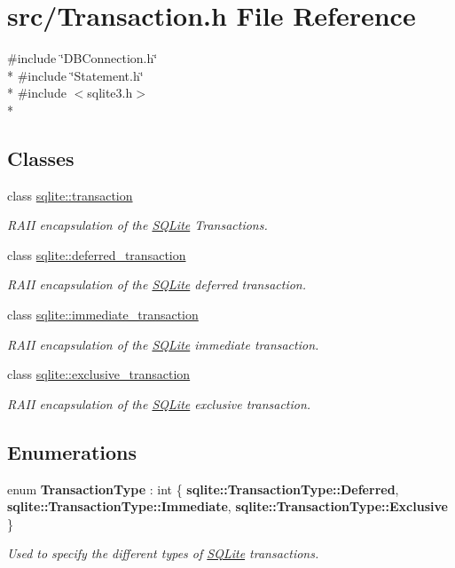 \hypertarget{a00034}{\section{src/\-Transaction.h File Reference}
\label{a00034}
}
{\ttfamily \#include \char`\"{}D\-B\-Connection.\-h\char`\"{}}\\*
{\ttfamily \#include \char`\"{}Statement.\-h\char`\"{}}\\*
{\ttfamily \#include $<$sqlite3.\-h$>$}\\*
\subsection*{Classes}
\begin{DoxyCompactItemize}
\item 
class \hyperlink{a00014}{sqlite\-::transaction}
\begin{DoxyCompactList}\small\item\em R\-A\-I\-I encapsulation of the \hyperlink{a00038}{S\-Q\-Lite} Transactions. \end{DoxyCompactList}\item 
class \hyperlink{a00005}{sqlite\-::deferred\-\_\-transaction}
\begin{DoxyCompactList}\small\item\em R\-A\-I\-I encapsulation of the \hyperlink{a00038}{S\-Q\-Lite} deferred transaction. \end{DoxyCompactList}\item 
class \hyperlink{a00008}{sqlite\-::immediate\-\_\-transaction}
\begin{DoxyCompactList}\small\item\em R\-A\-I\-I encapsulation of the \hyperlink{a00038}{S\-Q\-Lite} immediate transaction. \end{DoxyCompactList}\item 
class \hyperlink{a00007}{sqlite\-::exclusive\-\_\-transaction}
\begin{DoxyCompactList}\small\item\em R\-A\-I\-I encapsulation of the \hyperlink{a00038}{S\-Q\-Lite} exclusive transaction. \end{DoxyCompactList}\end{DoxyCompactItemize}
\subsection*{Enumerations}
\begin{DoxyCompactItemize}
\item 
enum {\bfseries Transaction\-Type} \-: int \{ {\bfseries sqlite\-::\-Transaction\-Type\-::\-Deferred}, 
{\bfseries sqlite\-::\-Transaction\-Type\-::\-Immediate}, 
{\bfseries sqlite\-::\-Transaction\-Type\-::\-Exclusive}
 \}
\begin{DoxyCompactList}\small\item\em Used to specify the different types of \hyperlink{a00038}{S\-Q\-Lite} transactions. \end{DoxyCompactList}\end{DoxyCompactItemize}
